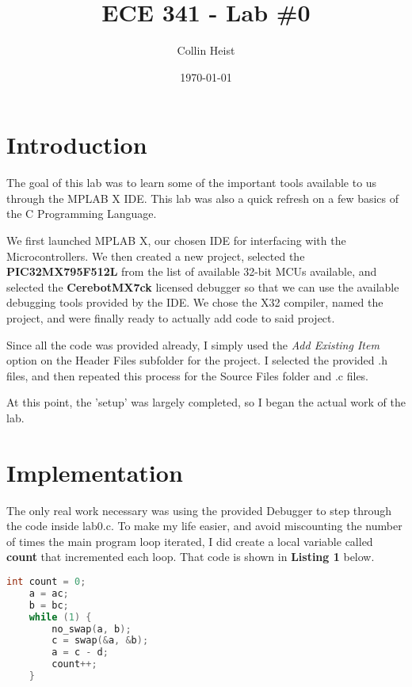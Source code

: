 \documentclass[a4paper, 12pt]{article}
\begin{document}
\title{ECE 341 - Lab \#0}
\author{Collin Heist}
\date{\today}
\maketitle
{}
\tableofcontents
\lstlistoflistings
\newpage
{}

\section{Introduction}
The goal of this lab was to learn some of the important tools available to us through the MPLAB X IDE. This lab was also a quick refresh on a few basics of the C Programming Language.

We first launched MPLAB X, our chosen IDE for interfacing with the Microcontrollers. We then created a new project, selected the \textbf{PIC32MX795F512L} from the list of available 32-bit MCUs available, and selected the \textbf{CerebotMX7ck} licensed debugger so that we can use the available debugging tools provided by the IDE. We chose the X32 compiler, named the project, and were finally ready to actually add code to said project.

Since all the code was provided already, I simply used the \textit{Add Existing Item} option on the Header Files subfolder for the project. I selected the provided .h files, and then repeated this process for the Source Files folder and .c files.

At this point, the 'setup' was largely completed, so I began the actual work of the lab. 

\section{Implementation}
The only real work necessary was using the provided Debugger to step through the code inside lab0.c. To make my life easier, and avoid miscounting the number of times the main program loop iterated, I did create a local variable called \textbf{count} that incremented each loop. That code is shown in \textbf{Listing 1} below.
	\begin{mdframed}[backgroundcolor=code-gray, roundcorner=10pt,
								innerleftmargin=5, innertopmargin=5, innerbottommargin=5]	
	\begin{lstlisting}[language=C, caption=Counting Variable, tabsize=2]
	int count = 0;
	a = ac;
	b = bc;
	while (1) {
		no_swap(a, b);
		c = swap(&a, &b);
		a = c - d;
		count++;
	}
	\end{lstlisting}
	\end{mdframed}
	
\end{document}

